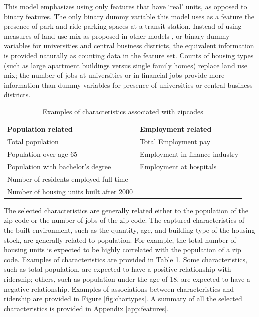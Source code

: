 \documentclass[11pt]{report}
\begin{document}
This model emphasizes using only features that have `real' units, as opposed to binary features. The only binary dummy variable this model uses as a feature the presence of park-and-ride parking spaces at a transit station. Instead of using measures of land use mix as proposed in other models \cite{Durning2015, Gutierrez2011}, or binary dummy variables for universities and central business districts, the equivalent information is provided naturally as counting data in the feature set. Counts of housing types (such as large apartment buildings versus single family homes) replace land use mix; the number of jobs at universities or in financial jobs provide more information than dummy variables for presence of universities or central business districts. 

\begin{table}[H]
\centering\begingroup\fontsize{10}{10}\selectfont
\begin{tabular}{ll}
\toprule \textbf{Population related}&\textbf{Employment related} \\ 
\midrule Total population&Total Employment pay\\
Population over age 65& Employment in finance industry\\
Population with bachelor's degree& Employment at hospitals\\
Number of residents employed full time&\\
Number of housing units built after 2000&\\
\bottomrule
\end{tabular}\endgroup
\caption{Examples of characteristics associated with zipcodes}\label{tab:char}
\end{table}

The selected characteristics are generally related either to the population of the zip code or the number of jobs of the zip code. The captured characteristics of the built environment, such as the quantity, age, and building type of the housing stock, are generally related to population. For example, the total number of housing units is expected to be highly correlated with the population of a zip code.  Examples of characteristics are provided in Table \ref{tab:char}. Some characteristics, such as total population, are expected to have a positive relationship with ridership; others, such as population under the age of 18, are expected to have a negative relationship. Examples of associations between characteristics and ridership are provided in Figure \ref{fig:chartypes}. A summary of all the selected characteristics is provided in Appendix \ref{app:features}.
\end{document}
